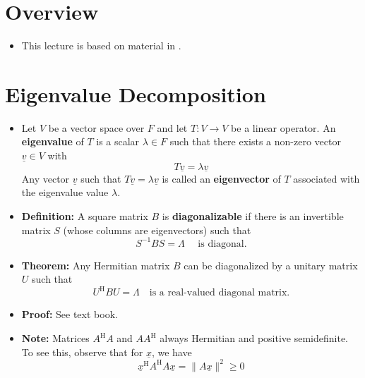 \documentclass[11pt,twoside]{report}
\newcommand{\vecnot}{\underline}
\newcommand{\Herm}{{\mathrm{H}}}
\begin{document}



\section*{Overview} 

\begin{itemize}


\item This lecture is based on material in  \cite[Chapters 7,8, and 6]{chamberland:2023EF}.%


\end{itemize}


\section{Eigenvalue Decomposition}

\begin{itemize}
\item Let $V$ be a vector space over $F$ and let $T\colon V \to V$ be a linear operator.
An \textbf{eigenvalue} of $T$ is a scalar $\lambda \in F$ such that there exists a non-zero vector $\vecnot{v} \in V$ with 
\[
T \vecnot{v} = \lambda \vecnot{v}
\]
Any vector $\vecnot{v}$ such that $T \vecnot{v} = \lambda \vecnot{v}$ is called an \textbf{eigenvector} of $T$ associated with the eigenvalue value $\lambda$.

\item \textbf{Definition:} A square matrix $B$ is \textbf{diagonalizable} if there is an invertible matrix $S$ (whose columns are eigenvectors) such that 
\[
S^{-1} B S = \Lambda \quad \text{ is diagonal.}
\]


\item \textbf{Theorem:} Any Hermitian matrix $B$ can be diagonalized by a unitary matrix $U$ such that 
\[
U^\Herm B U = \Lambda \quad  \text{is a real-valued diagonal matrix.}
\]


\item \textbf{Proof:} See text book. 

\item \textbf{Note:} Matrices $A^\Herm A$ and $A A^\Herm$ always Hermitian and positive semidefinite. To see this, observe that for $\vecnot{x} $, we have 
\[
\vecnot{x}^\Herm A^\Herm A \vecnot{x} = \| A \vecnot{x} \|^2 \ge 0 
\]

\end{itemize}
\end{document}
